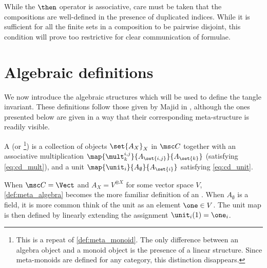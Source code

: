 \begin{remark}
        While the $\then$ operator is associative, care must be taken that the
        compositions are well-defined in the presence of duplicated indices.
        While it is sufficient for all the finite sets in a composition to be
        pairwise disjoint, this condition will prove too restrictive for clear
        communication of formulae.
\end{remark}

\section{Algebraic definitions}\label{sec:alg_defs}

We now introduce the algebraic structures which will be used to define the
tangle invariant. These definitions follow those given by Majid in \cite{SM},
although the ones presented below are given in a way that their corresponding
meta-structure is readily visible.

\begin{definition}\label{def:meta_algebra}
        A  (or \footnote{%
                This is a repeat of \cref{def:meta_monoid}. The only difference
                between an algebra object and a monoid object is the presence of
                a linear structure. Since meta-monoids are defined for any
                category, this distinction disappears.%
        }) is a collection of objects
        $\set{A_X}_X$ in $\CC$ together with an associative multiplication
        $\map {\mult^{i,j}_{k}} {A_{\set{i,j}}} {A_{\set{k}}}$ (satisfying
        \cref{eq:cd_mult}), and a unit
        $\map{\unit_{i}}{A_{\emptyset}}{A_{\set{i}}}$ satisfying
        \cref{eq:cd_unit}.
\end{definition}
\begin{remark}
When $\CC = \Vect$ and $A_X = V^{\otimes X}$ for some vector space $V$,
\cref{def:meta_algebra} becomes the more familiar definition of an
. When $A_\emptyset$ is a field, it is more common think of the
unit as an element $\one\in V$. The unit map is then defined by linearly
extending the assignment $\unit_{i}(1) = \one_{i}$.
\end{remark}

